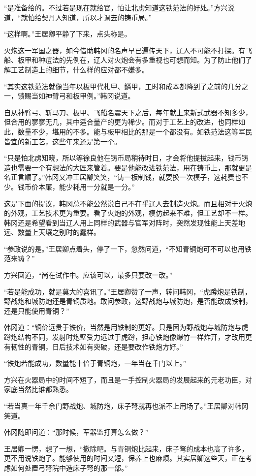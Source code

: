 “是准备给的。不过若是现在就给官，怕让北虏知道这铁范法的好处。”方兴说道，“就怕给契丹人知道，所以才调去的铸币局。”

“这样啊。”王居卿平静了下来，点头称是。

火炮这一军国之器，如今借助韩冈的名声早已遍传天下，辽人不可能不打探。有飞船、板甲和种痘法的先例在，辽人对火炮会有多重视也可想而知。为了防止他们了解工艺制造上的细节，什么样的应对都不嫌多。

“其实这铁范法就像当年以板甲代札甲、鳞甲，工时和成本都降到了之前的几分之一，馈赐当如神臂弓和板甲例。”韩冈说道。

自从神臂弓、斩马刀、板甲、飞船名震天下之后，每年献上来新式武器不知多少，但合用的寥寥无几，其中适合量产的更为稀少。而对于工艺上的改进，也同样如此，数量不少，堪用的不多。能与板甲相比的那是一个都没有。如铁范法这等军民皆宜的新工艺，这些年来还是第一个。

“只是怕北虏知晓，所以等徐良他在铸币局稍待时日，才会将他提拔起来，钱币铸造也需要一个有想法的大匠来管着。要是他能改进铁范法，用在铸币上，那就更是名正言顺了。”韩冈又冲王居卿笑笑，“铸一板制钱，就要换一次模子，这耗费也不少。钱币价本廉，能少耗用一分就是一分。”

这是下面的提议，韩冈总不能公然说自己不在乎辽人去制造火炮。而且相对于火炮的外观，工艺技术更为重要。看了火炮的外观，模仿起来不难，但工艺却不一样。韩冈还是希望看到当辽人用上同样的武器与官军对阵时，突然发现性能上天差地远、数量上天壤之别时的蠢样。

“参政说的是。”王居卿点着头，停了一下，忽然问道，“不知青铜炮可不可以也用铁范来铸？”

方兴回道，“尚在试作中。应该可以，最多只要改一改。”

“若是能成功，就是莫大的喜讯了。”王居卿赞了一声，转问韩冈，“虎蹲炮是铁制，野战炮和城防炮还是青铜质地。敢问参政，这野战炮与城防炮，是否能改成铁制，还是只能使用青铜？”

韩冈道：“铜价远贵于铁价，当然是用铁制的更好。只是因为野战炮与城防炮与虎蹲炮结构不同，发射时炮壁受力远过于虎蹲，担心铁炮像爆竹一样炸开，才改用更有韧性的青铜，日后技术如有突破，还是要改作铁炮方好。”

“铁炮若能成功，数量能十倍于青铜炮，一年当在千门以上。”

方兴在火器局中的时间不短了，而且是一手控制火器局的发展起来的元老功臣，对家底当然比谁都熟悉。

“若当真一年千余门野战炮、城防炮，床子弩就再也派不上用场了。”王居卿对韩冈笑道。

韩冈随即问道：“那时候，军器监打算怎么做？”

王居卿一愣，想了一想，“撤除吧。与青铜炮比起来，床子弩的成本也高了许多，更不用说铁炮了。能够使用的时间又短，保养上也麻烦。其实居卿这些天，正在考虑如何处置弓弩院中造床子弩的那一部。”

